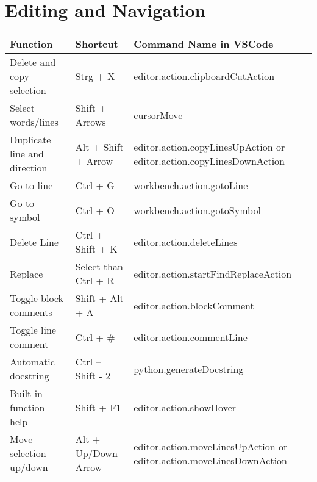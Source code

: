 \documentclass{article}
\begin{document}
\section*{Editing and Navigation}
\begin{longtable}{|p{6cm}|p{3cm}|p{7cm}|}
\hline
\rowcolor{white}
\textbf{Function} & \textbf{Shortcut} & \textbf{Command Name in VSCode} \\
\hline
Delete and copy selection & Strg + X & editor.action.clipboardCutAction \\
Select words/lines & Shift + Arrows & cursorMove \\
Duplicate line and direction & Alt + Shift + Arrow & editor.action.copyLinesUpAction or editor.action.copyLinesDownAction \\
Go to line & Ctrl + G & workbench.action.gotoLine \\
Go to symbol & Ctrl + O & workbench.action.gotoSymbol \\
Delete Line & Ctrl + Shift + K & editor.action.deleteLines \\
Replace & Select than Ctrl + R & editor.action.startFindReplaceAction \\
Toggle block comments & Shift + Alt + A & editor.action.blockComment \\
Toggle line comment & Ctrl + \# & editor.action.commentLine \\
Automatic docstring & Ctrl – Shift - 2 & python.generateDocstring \\
Built-in function help & Shift + F1 & editor.action.showHover \\
Move selection up/down & Alt + Up/Down Arrow & editor.action.moveLinesUpAction or editor.action.moveLinesDownAction \\
\hline
\end{longtable}

\newpage
{}
\end{document}
